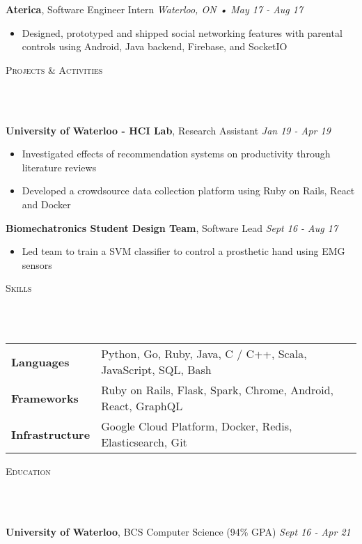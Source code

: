 \documentclass[a4paper, 12pt, hidelinks]{article}
\newcommand{\lineunder} {
    \vspace*{-8pt} \\
    \hrulefill \\
}
\newcommand{\header} [1] {
    \color{bigtext}
    {\hspace*{-4pt}\vspace*{6pt} \textsc{#1}}
    \vspace*{-6pt}
    \color{weaktext}
    \lineunder
    \vspace{6pt}
    \color{bodytext}
}
\newcommand{\nolocheader} [3] {
    \color{bigtext}\textbf{#1}, {#2}
    \color{weaktext}\hfill{\small\textit{#3}}\\
    \vspace{-3mm} \color{bodytext}
}
\newcommand{\jobheader} [4] {
    \nolocheader{#1}{#2}{\small\textit{#3} • \textit{#4}}
}
\begin{document}
\jobheader{Aterica}{Software Engineer Intern}{Waterloo, ON}{May 17 - Aug 17}
\begin{itemize}[leftmargin=1.8em] \itemsep 1pt \color{bodytext}
	\item Designed, prototyped and shipped social networking features with parental controls using Android,
    Java backend, Firebase, and SocketIO
\end{itemize}

\header{Projects \& Activities}

\nolocheader{University of Waterloo - HCI Lab}{Research Assistant}{Jan 19 - Apr 19}
\begin{itemize}[leftmargin=1.8em] \itemsep 1pt \color{bodytext}
	\item Investigated effects of recommendation systems on productivity through literature reviews
	\item Developed a crowdsource data collection platform using Ruby on Rails, React and Docker
\end{itemize}

\nolocheader{Biomechatronics Student Design Team}{Software Lead}{Sept 16 - Aug 17}
\begin{itemize}[leftmargin=1.8em] \itemsep 1pt \color{bodytext}
	\item Led team to train a SVM classifier to control a prosthetic hand using EMG sensors
\end{itemize}

\header{Skills}

\hspace{-10pt}
\begin{tabular}{ l l }
    \color{bigtext}\textbf{Languages}\color{bodytext} & Python, Go, Ruby, Java, C / C++, Scala, JavaScript, SQL, Bash \\[2pt]
    \color{bigtext}\textbf{Frameworks}\color{bodytext} & Ruby on Rails, Flask, Spark, Chrome, Android, React, GraphQL \\[2pt]
    \color{bigtext}\textbf{Infrastructure}\color{bodytext} & Google Cloud Platform, Docker, Redis, Elasticsearch, Git
\end{tabular}
\vspace{3mm}

\header{Education}
\nolocheader{University of Waterloo}{BCS Computer Science (94\% GPA)}{Sept 16 - Apr 21}
\end{document}

